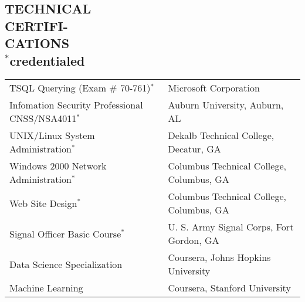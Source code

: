 \documentclass[margin, 10pt]{res} %
\begin{document}
\begin{resume}
 


\section{TECHNICAL\\CERTIFI-\\CATIONS\\
\scriptsize{$^*$credentialed}
}

\small
    \begin{tabular}{l l }
        TSQL Querying (Exam \# 70-761)$^*$ & Microsoft Corporation\\
        Infomation Security Professional CNSS/NSA4011$^*$  & Auburn University, Auburn, AL\\
        UNIX/Linux System Administration$^*$  & Dekalb Technical College,  Decatur, GA\\
        Windows 2000 Network Administration$^*$  & Columbus Technical College, Columbus, GA\\
        Web Site Design$^*$  & Columbus Technical College, Columbus, GA\\
        Signal Officer Basic Course$^*$  & U. S. Army Signal Corps,  Fort Gordon, GA\\
        Data Science Specialization & Coursera, Johns Hopkins University\\
        Machine Learning & Coursera, Stanford University\\
    \end{tabular}
    \normalsize
%
%
%
%
%
%



\end{resume}
\end{document}

